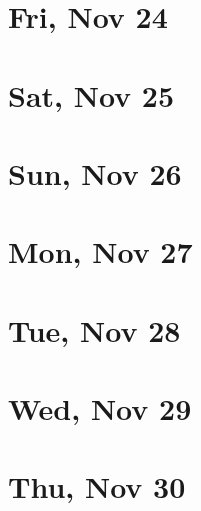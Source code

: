 	\section{Fri, Nov 24}
		
	\section{Sat, Nov 25}
		
	\section{Sun, Nov 26}
		
	\section{Mon, Nov 27}
		
	\section{Tue, Nov 28}
		
	\section{Wed, Nov 29}
		
	\section{Thu, Nov 30}
		
